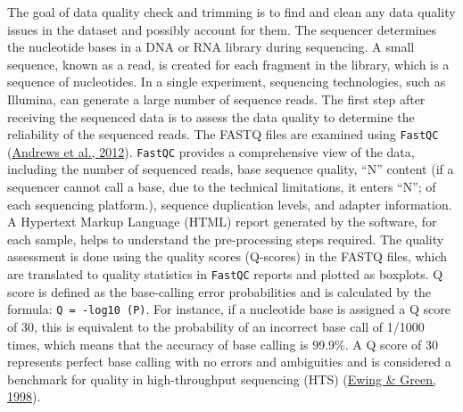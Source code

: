 \documentclass[12pt,twoside]{reedthesis}
\begin{document}
The goal of data quality check and trimming is to find and clean any
data quality issues in the dataset and possibly account for them. The
sequencer determines the nucleotide bases in a DNA or RNA library during
sequencing. A small sequence, known as a read, is created for each
fragment in the library, which is a sequence of nucleotides. In a single
experiment, sequencing technologies, such as Illumina, can generate a
large number of sequence reads. The first step after receiving the
sequenced data is to assess the data quality to determine the
reliability of the sequenced reads. The FASTQ files are examined using
\texttt{FastQC} (\protect\hyperlink{ref-andrews2012}{Andrews et al., 2012}). \texttt{FastQC} provides a comprehensive view of the
data, including the number of sequenced reads, base sequence quality,
``N'' content (if a sequencer cannot call a base, due to the technical
limitations, it enters ``N''; of each sequencing platform.), sequence
duplication levels, and adapter information. A Hypertext Markup Language
(HTML) report generated by the software, for each sample, helps to
understand the pre-processing steps required. The quality assessment is
done using the quality scores (Q-scores) in the FASTQ files, which are
translated to quality statistics in \texttt{FastQC} reports and plotted as
boxplots. Q score is defined as the base-calling error probabilities and
is calculated by the formula: \texttt{Q\ =\ -log10\ (P)}. For instance, if a
nucleotide base is assigned a Q score of 30, this is equivalent to the
probability of an incorrect base call of 1/1000 times, which means that
the accuracy of base calling is 99.9\%. A Q score of 30 represents
perfect base calling with no errors and ambiguities and is considered a
benchmark for quality in high-throughput sequencing (HTS) (\protect\hyperlink{ref-ewing1998}{Ewing \& Green, 1998}).
\end{document}
